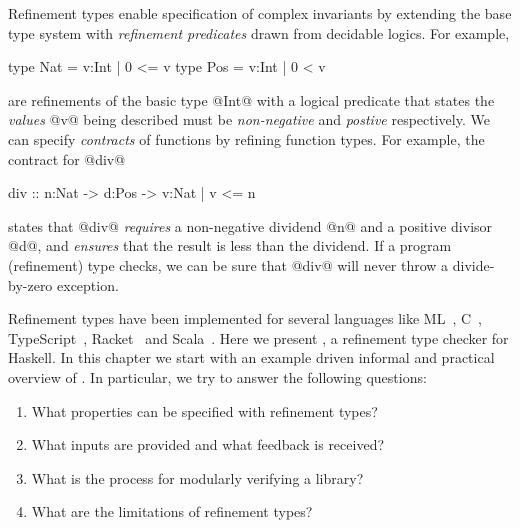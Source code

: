 Refinement types enable specification of complex invariants 
by extending the base type system with \emph{refinement predicates} 
drawn from decidable logics. For example,
%
\begin{code}
  type Nat = {v:Int | 0 <= v}
  type Pos = {v:Int | 0 < v}
\end{code}
%
are refinements of the basic type @Int@ with a logical predicate 
that states the \emph{values} @v@ being described must be 
\emph{non-negative} and \emph{postive} respectively. 
%
We can specify \emph{contracts} of functions by refining function types. 
For example, the contract for @div@
%
\begin{code}
  div :: n:Nat -> d:Pos -> {v:Nat | v <= n}
\end{code}
%
states that @div@ \emph{requires} a non-negative dividend @n@ and a positive
divisor @d@, and \emph{ensures} that the result is less than the dividend.
%
If a program (refinement) type checks, we can be sure that @div@ will never 
throw a divide-by-zero exception.

Refinement types \citep{ConstableS87,Rushby98} 
have been implemented for several languages like
ML~\cite{pfenningxi98,GordonRefinement09,LiquidPLDI08},
C~\cite{deputy,LiquidPOPL10},
TypeScript~\cite{Vekris16},
Racket~\cite{RefinedRacket} and Scala~\cite{refinedscala}.
%
Here we present \toolname,
a refinement type checker for Haskell.
%
In this chapter we start with an example driven informal and practical overview
of \toolname.
%
In particular, we try to answer the following questions:
%
\begin{enumerate}
  \item What properties can be specified with refinement types?
  \item What inputs are provided and what feedback is received?
  \item What is the process for modularly verifying a library?
  \item What are the limitations of refinement types? 
\end{enumerate}

